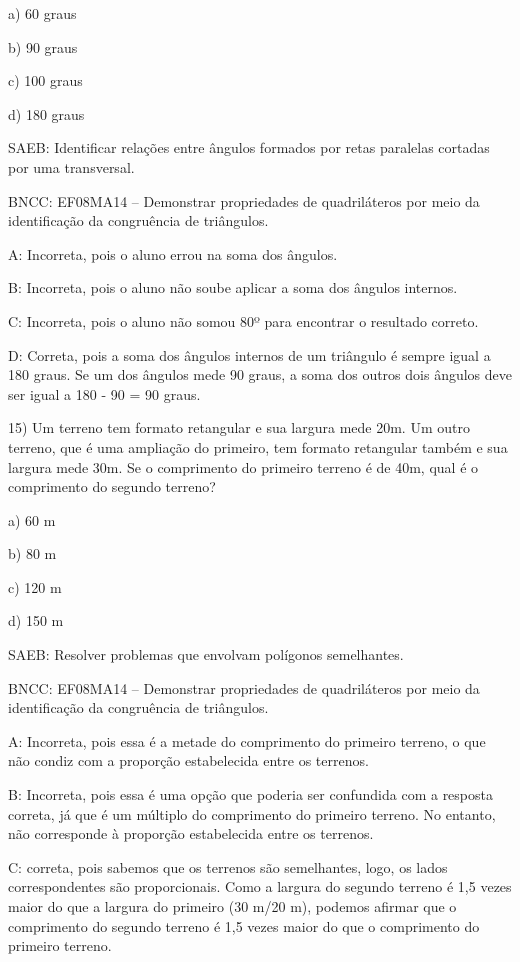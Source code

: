 a) 60 graus

b) 90 graus

c) 100 graus

d) 180 graus

SAEB: Identificar relações entre ângulos formados por retas paralelas
cortadas por uma transversal.

BNCC: EF08MA14 -- Demonstrar propriedades de quadriláteros por meio da
identificação da congruência de triângulos.

A: Incorreta, pois o aluno errou na soma dos ângulos.

B: Incorreta, pois o aluno não soube aplicar a soma dos ângulos
internos.

C: Incorreta, pois o aluno não somou 80º para encontrar o resultado
correto.

D: Correta, pois a soma dos ângulos internos de um triângulo é sempre
igual a 180 graus. Se um dos ângulos mede 90 graus, a soma dos outros
dois ângulos deve ser igual a 180 - 90 = 90 graus.

15) Um terreno tem formato retangular e sua largura mede 20m. Um outro
terreno, que é uma ampliação do primeiro, tem formato retangular também
e sua largura mede 30m. Se o comprimento do primeiro terreno é de 40m,
qual é o comprimento do segundo terreno?

a) 60 m

b) 80 m

c) 120 m

d) 150 m

SAEB: Resolver problemas que envolvam polígonos semelhantes.

BNCC: EF08MA14 -- Demonstrar propriedades de quadriláteros por meio da
identificação da congruência de triângulos.

A: Incorreta, pois essa é a metade do comprimento do primeiro terreno, o
que não condiz com a proporção estabelecida entre os terrenos.

B: Incorreta, pois essa é uma opção que poderia ser confundida com a
resposta correta, já que é um múltiplo do comprimento do primeiro
terreno. No entanto, não corresponde à proporção estabelecida entre os
terrenos.

C: correta, pois sabemos que os terrenos são semelhantes, logo, os lados
correspondentes são proporcionais. Como a largura do segundo terreno é
1,5 vezes maior do que a largura do primeiro (30 m/20 m), podemos
afirmar que o comprimento do segundo terreno é 1,5 vezes maior do que o
comprimento do primeiro terreno.

